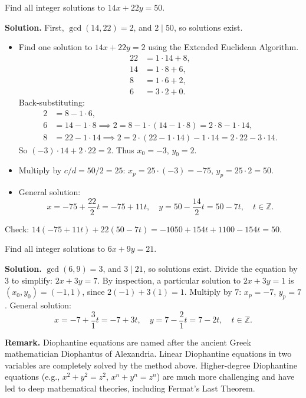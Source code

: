 \documentclass[11pt,a4paper]{article}
\begin{document}
\begin{example}
Find all integer solutions to $14x + 22y = 50$.

\textbf{Solution.}
First, $\gcd(14, 22) = 2$, and $2 \mid 50$, so solutions exist.
\begin{itemize}[label=--]
    \item Find one solution to $14x + 22y = 2$ using the Extended Euclidean Algorithm.
    \begin{align*}
        22 &= 1 \cdot 14 + 8, \\
        14 &= 1 \cdot 8 + 6, \\
        8 &= 1 \cdot 6 + 2, \\
        6 &= 3 \cdot 2 + 0.
    \end{align*}
    Back-substituting:
    \begin{align*}
        2 &= 8 - 1 \cdot 6, \\
        6 &= 14 - 1 \cdot 8 \implies 2 = 8 - 1 \cdot (14 - 1 \cdot 8) = 2 \cdot 8 - 1 \cdot 14, \\
        8 &= 22 - 1 \cdot 14 \implies 2 = 2 \cdot (22 - 1 \cdot 14) - 1 \cdot 14 = 2 \cdot 22 - 3 \cdot 14.
    \end{align*}
    So $(-3) \cdot 14 + 2 \cdot 22 = 2$. Thus $x_0 = -3$, $y_0 = 2$.
    \item Multiply by $c/d = 50/2 = 25$: $x_p = 25 \cdot (-3) = -75$, $y_p = 25 \cdot 2 = 50$.
    \item General solution:
    \begin{equation*}
        x = -75 + \frac{22}{2} t = -75 + 11t, \quad y = 50 - \frac{14}{2} t = 50 - 7t, \quad t \in \mathbb{Z}.
    \end{equation*}
\end{itemize}
Check: $14(-75 + 11t) + 22(50 - 7t) = -1050 + 154t + 1100 - 154t = 50$.
\end{example}

\begin{example}
Find all integer solutions to $6x + 9y = 21$.

\textbf{Solution.}
$\gcd(6, 9) = 3$, and $3 \mid 21$, so solutions exist. Divide the equation by $3$ to simplify: $2x + 3y = 7$. By inspection, a particular solution to $2x + 3y = 1$ is $(x_0, y_0) = (-1, 1)$, since $2(-1) + 3(1) = 1$. Multiply by $7$: $x_p = -7$, $y_p = 7$.
General solution:
\begin{equation*}
    x = -7 + \frac{3}{1} t = -7 + 3t, \quad y = 7 - \frac{2}{1} t = 7 - 2t, \quad t \in \mathbb{Z}.
\end{equation*}
\end{example}

\textbf{Remark.} Diophantine equations are named after the ancient Greek mathematician Diophantus of Alexandria. Linear Diophantine equations in two variables are completely solved by the method above. Higher-degree Diophantine equations (e.g., $x^2 + y^2 = z^2$, $x^n + y^n = z^n$) are much more challenging and have led to deep mathematical theories, including Fermat's Last Theorem.
\end{document}
